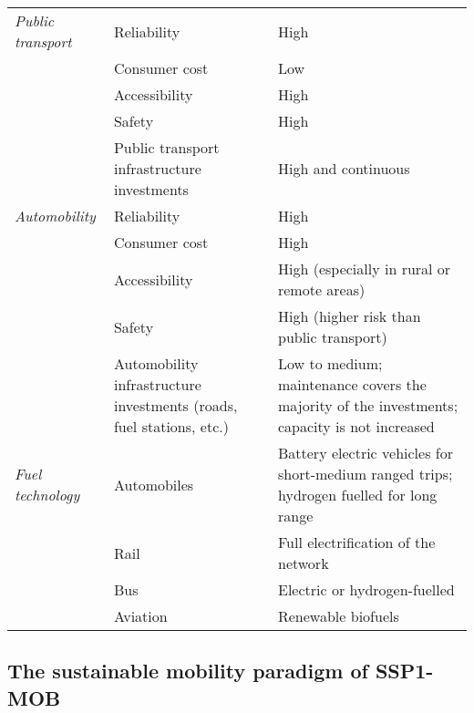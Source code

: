 \begin{table}
\begin{tabular}{p{2.5cm}p{3cm}p{8cm}}
\textit{Public transport} & Reliability & High \\
 & Consumer cost & Low \\
 & Accessibility & High \\
 & Safety & High \\
 & Public transport infrastructure investments & High and continuous \\\midrule
\textit{Automobility} & Reliability & High \\
 & Consumer cost & High \\
 & Accessibility & High (especially in rural or remote areas) \\
 & Safety & High (higher risk than public transport) \\
 & Automobility infrastructure investments (roads, fuel stations, etc.) & Low to medium; maintenance covers the majority of the investments; capacity is not increased \\\midrule
\textit{Fuel technology} & Automobiles & Battery electric vehicles for short-medium ranged trips; hydrogen fuelled for long range \\
 & Rail & Full electrification of the network \\
 & Bus & Electric or hydrogen-fuelled \\
 & Aviation & Renewable biofuels \\ \bottomrule
\end{tabular}
\end{table}

\subsection{The sustainable mobility paradigm of SSP1-MOB}
\label{ss:results:ssp1-mob-paradigm}

